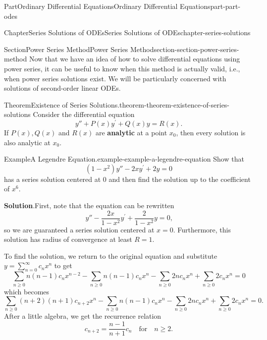 \documentclass[twoside,10pt,]{book}
\newcommand{\blocktitlefont}{\relax}
\newcommand{\terminology}[1]{\textbf{#1}}
\numberwithin{equation}{part}
\begin{document}
\begin{partptx}{Part}{Ordinary Differential Equations}{}{Ordinary Differential Equations}{}{}{part-part-odes}
\begin{chapterptx}{Chapter}{Series Solutions of ODEs}{}{Series Solutions of ODEs}{}{}{chapter-series-solutions}
\begin{sectionptx}{Section}{Power Series Method}{}{Power Series Method}{}{}{section-section-power-series-method}
Now that we have an idea of how to solve differential equations using power series, it can be useful to know when this method is actually valid, i.e., when power series solutions exist. We will be particularly concerned with solutions of second-order linear ODEs.%
\begin{theorem}{Theorem}{Existence of Series Solutions.}{}{theorem-theorem-existence-of-series-solutions}%
Consider the differential equation%
\begin{equation*}
y'' + P(x)y^\prime + Q(x)y = R(x)\text{.}
\end{equation*}
If \(P(x), Q(x)\) and \(R(x)\) are \terminology{analytic} at a point \(x_{0}\), then every solution is also analytic at \(x_{0}\).%
\end{theorem}
\begin{example}{Example}{A Legendre Equation.}{example-example-a-legendre-equation}%
Show that%
\begin{equation*}
(1 - x^{2})y'' - 2xy^\prime + 2y = 0
\end{equation*}
has a series solution centered at \(0\) and then find the solution up to the coefficient of \(x^{6}\).%
\par\smallskip%
\noindent\textbf{\blocktitlefont Solution}.\hypertarget{solution-example-a-legendre-equation-c}{}\quad{}First, note that the equation can be rewritten%
\begin{equation*}
y'' - \frac{2x}{1 - x^{2}}y^\prime + \frac{2}{1 - x^{2}}y = 0\text{,}
\end{equation*}
so we are guaranteed a series solution centered at \(x = 0\). Furthermore, this solution has radius of convergence at least \(R = 1\).%
\par
To find the solution, we return to the original equation and substitute \(y = \sum_{n=0}^{\infty}c_{n}x^{n}\) to get%
\begin{equation*}
\sum_{n\geq0}n(n-1)c_{n}x^{n-2} - \sum_{n\geq0}n(n-1)c_{n}x^{n} - \sum_{n\geq0}2nc_{n}x^{n} + \sum_{n\geq0}2c_{n}x^{n} = 0
\end{equation*}
which becomes%
\begin{equation*}
\sum_{n\geq0}(n + 2)(n+1)c_{n+2}x^{n} - \sum_{n\geq0}n(n-1)c_{n}x^{n} - \sum_{n\geq0}2nc_{n}x^{n} + \sum_{n\geq0}2c_{n}x^{n} = 0\text{.}
\end{equation*}
After a little algebra, we get the recurrence relation%
\begin{equation*}
c_{n+2} = \frac{n-1}{n+1}c_{n}\quad\text{for}\quad n\geq2\text{.}
\end{equation*}

\end{example}
\end{sectionptx}
\end{chapterptx}
\end{partptx}
\end{document}
